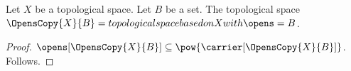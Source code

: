 

\begin{construction}\label{unproved_opens_copy}
    Let $X$ be a topological space.
    Let $B$ be a set.
    The topological space $\OpensCopy{X}{B}=
        topological space based on X with \opens=B$.
\end{construction}
\begin{proof}
    $\opens[\OpensCopy{X}{B}]\subseteq\pow{\carrier[\OpensCopy{X}{B}]}$.
    Follows.
\end{proof}
